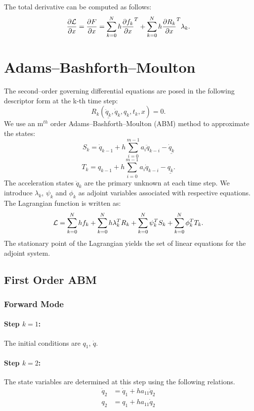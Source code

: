 \documentclass[10pt,letter]{book}
\newcommand{\pd}[2]{\dfrac{\partial #1}{\partial #2}}
\begin{document}
     The total derivative can be computed as follows:
     $$\pd{\cal{L}}{x} = \pd{F}{x} = \sum_{k=0}^N h \pd{f_k}{x}^T + \sum_{k=0}^N h
     \pd{R_k}{x}^T \lambda_k.$$

     \section{Adams--Bashforth--Moulton}

     The second--order governing differential equations are posed in the following
     descriptor form at the k-th time step:
     $$ R_k(\underline{\ddot{q}_k}, \dot{q}_k, q_k, t_k , x) = 0.$$
     We use an m$^{th}$ order Adams--Bashforth--Moulton (ABM) method to approximate the states:
     $$ S_k =   \dot{q}_{k-1}  + h \sum_{i=0}^{m-1} a_i \ddot{q}_{k-i} - \underline{\dot{q}_k} $$ 
     $$ T_k =   {q}_{k-1}  + h \sum_{i=0}^{m-1} a_i \dot{q}_{k-i} - \underline{{q}_k} .$$
     The acceleration states $\ddot{q}_k$ are the primary unknown at each time step. We introduce $\lambda_k$, $\psi_k$ and $\phi_k$ as adjoint variables
     associated with respective equations. The Lagrangian function is written
     as:
     $${\cal{L}} = \sum_{k=0}^N h f_k + \sum_{k=0}^N h \lambda_k^T
     R_k + \sum_{k=0}^N \psi_k^T S_k + \sum_{k=0}^N \phi_k^T T_k. $$
     The stationary point of the Lagrangian yields the set of linear
     equations for the adjoint system.

     \subsection{First Order ABM}

     \subsubsection{Forward Mode}
     \paragraph{Step $k=1$:}
     The initial conditions are $q_1$, $\dot{q}$.
     
     \paragraph{Step $k=2$:}
     The state variables are determined at this step using the
     following relations.
     \begin{equation}\nonumber
       \begin{split}
         \dot{q}_{2} &= \dot{q}_1 + h a_{11} \ddot{q}_{2}  \\
         q_{2}       &= q_1 + h a_{11} \dot{q}_{2}
       \end{split}
     \end{equation}
\end{document}
